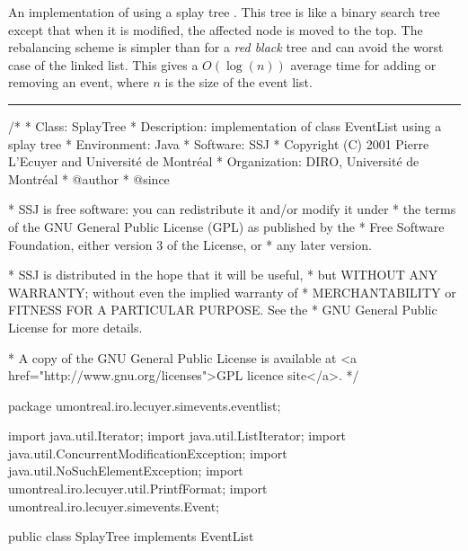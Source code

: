 
An implementation of  using a splay tree \cite{iSLE85a}.
This tree is like a binary search tree except that when it
is modified, the affected node is moved to the top.
The rebalancing scheme is simpler than for a \emph{red black}
tree and can avoid the worst case of the linked list.
This gives a $O(\log (n))$ average time for adding or removing
an event, where $n$ is the size of the event list.

\bigskip\hrule

\begin{code}
\begin{hide}
/*
 * Class:        SplayTree
 * Description:  implementation of class EventList using a splay tree 
 * Environment:  Java
 * Software:     SSJ 
 * Copyright (C) 2001  Pierre L'Ecuyer and Université de Montréal
 * Organization: DIRO, Université de Montréal
 * @author       
 * @since

 * SSJ is free software: you can redistribute it and/or modify it under
 * the terms of the GNU General Public License (GPL) as published by the
 * Free Software Foundation, either version 3 of the License, or
 * any later version.

 * SSJ is distributed in the hope that it will be useful,
 * but WITHOUT ANY WARRANTY; without even the implied warranty of
 * MERCHANTABILITY or FITNESS FOR A PARTICULAR PURPOSE.  See the
 * GNU General Public License for more details.

 * A copy of the GNU General Public License is available at
   <a href="http://www.gnu.org/licenses">GPL licence site</a>.
 */
\end{hide}
package umontreal.iro.lecuyer.simevents.eventlist; \begin{hide}

import java.util.Iterator;
import java.util.ListIterator;
import java.util.ConcurrentModificationException;
import java.util.NoSuchElementException;
import umontreal.iro.lecuyer.util.PrintfFormat;
import umontreal.iro.lecuyer.simevents.Event;
\end{hide}

public class SplayTree implements EventList\begin{hide} {
   private Entry root = null;
   private static Entry free = null;
   private int modCount = 0;

   private int myCompareTo (Event ev, Event other) {
      // A new event must always occur after those with the same time and
      // same priority in the Event list. getRa is used to ensure that.
      int j = ev.compareTo(other);
      if (0 != j)
         return j;
      if (ev.getRa() < other.getRa())
         return -1;
      if (ev.getRa() > other.getRa())
         return 1;
      return 0;
   }\end{hide}
\end{code}\begin{hide}\begin{code}


\end{code}
\end{hide}
